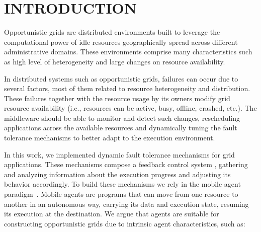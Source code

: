 \documentclass{cpeauth}
\begin{document}

\section{INTRODUCTION}

Opportunistic grids are distributed environments built to leverage the
computational power of idle resources geographically spread across different
administrative domains. These environments comprise many characteristics such as
high level of heterogeneity and large changes on resource availability. 

In distributed systems such as opportunistic grids, failures can occur due to
several factors, most of them related to resource heterogeneity and
distribution. These failures together with the resource usage by its
owners modify grid resource availability (i.e.,
resources can be active, busy, offline, crashed, etc.). The middleware should
be able to monitor and detect such changes, rescheduling 
applications across the available resources and dynamically tuning the fault
tolerance mechanisms to better adapt to the execution environment. 

In this work, we implemented dynamic fault tolerance mechanisms for grid
applications. These mechanisms compose a feedback control system
\cite{steere99, goel99}, gathering and analyzing information about the execution
progress and adjusting its behavior accordingly. To build these mechanisms we
rely in the mobile agent paradigm~\cite{pham98}. Mobile agents are programs that can move
from one resource to another in an autonomous way, carrying its data and
execution state, resuming its execution at the destination. We argue that
agents are suitable for constructing opportunistic grids due to intrinsic agent characteristics, 
such as:
\end{document}
